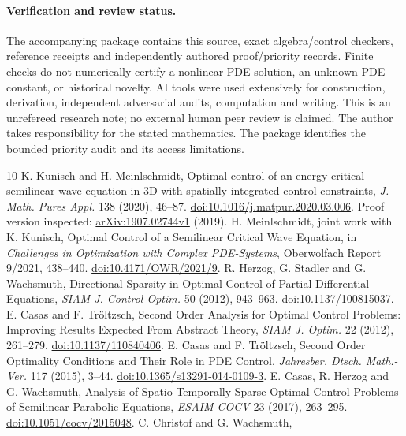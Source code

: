 \documentclass[11pt]{article}
\begin{document}
\paragraph{Verification and review status.}
The accompanying package contains this source, exact algebra/control
checkers, reference receipts and independently authored proof/priority
records. Finite checks do not numerically certify a nonlinear PDE solution,
an unknown PDE constant, or historical novelty. AI tools were used
extensively for construction, derivation, independent adversarial audits,
computation and writing. This is an unrefereed research note; no external
human peer review is claimed. The author takes responsibility for the
stated mathematics. The package identifies the bounded priority audit and
its access limitations.

\begin{thebibliography}{10}
 K. Kunisch and H. Meinlschmidt,
Optimal control of an energy-critical semilinear wave equation in 3D with
spatially integrated control constraints, \emph{J. Math. Pures Appl.}
138 (2020), 46--87. \href{https://doi.org/10.1016/j.matpur.2020.03.006}{doi:10.1016/j.matpur.2020.03.006}.
Proof version inspected: \href{https://arxiv.org/pdf/1907.02744v1}{arXiv:1907.02744v1} (2019).
 H. Meinlschmidt, joint work with K. Kunisch,
Optimal Control of a Semilinear Critical Wave Equation, in
\emph{Challenges in Optimization with Complex PDE-Systems}, Oberwolfach
Report 9/2021, 438--440.
\href{https://doi.org/10.4171/OWR/2021/9}{doi:10.4171/OWR/2021/9}.
 R. Herzog, G. Stadler and G. Wachsmuth,
Directional Sparsity in Optimal Control of Partial Differential Equations,
\emph{SIAM J. Control Optim.} 50 (2012), 943--963.
\href{https://doi.org/10.1137/100815037}{doi:10.1137/100815037}.
 E. Casas and F. Tr\"oltzsch,
Second Order Analysis for Optimal Control Problems: Improving Results
Expected From Abstract Theory, \emph{SIAM J. Optim.} 22 (2012), 261--279.
\href{https://doi.org/10.1137/110840406}{doi:10.1137/110840406}.
 E. Casas and F. Tr\"oltzsch,
Second Order Optimality Conditions and Their Role in PDE Control,
\emph{Jahresber. Dtsch. Math.-Ver.} 117 (2015), 3--44.
\href{https://doi.org/10.1365/s13291-014-0109-3}{doi:10.1365/s13291-014-0109-3}.
 E. Casas, R. Herzog and G. Wachsmuth,
Analysis of Spatio-Temporally Sparse Optimal Control Problems of Semilinear
Parabolic Equations, \emph{ESAIM COCV} 23 (2017), 263--295.
\href{https://doi.org/10.1051/cocv/2015048}{doi:10.1051/cocv/2015048}.
 C. Christof and G. Wachsmuth,

\end{thebibliography}
\end{document}
